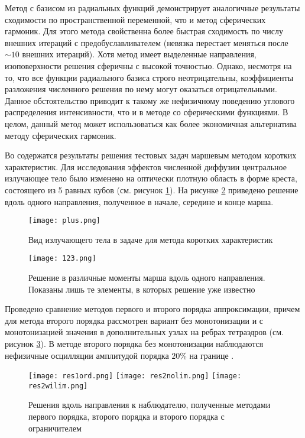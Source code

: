 Метод с базисом из радиальных функций демонстрирует аналогичные результаты сходимости по пространственной переменной, что и метод сферических гармоник. Для этого метода свойственна более быстрая сходимость по числу внешних итераций с предобуславливателем (невязка перестает меняться после $\sim 10$ внешних итераций). Хотя метод имеет выделенные направления, изоповерхности решения сферичны с высокой точностью. Однако, несмотря на то, что все функции радиального базиса строго неотрицательны, коэффициенты разложения численного решения по нему могут оказаться отрицательными. Данное обстоятельство приводит к такому же нефизичному поведению углового распределения интенсивности, что и в методе со сферическими функциями. В целом, данный метод может использоваться как более экономичная альтернатива методу сферических гармоник.

Во  содержатся результаты решения тестовых задач маршевым методом коротких характеристик. Для исследования эффектов численной диффузии центральное излучающее тело было изменено на оптически плотную область в форме креста, состоящего из 5 равных кубов (см. рисунок \ref{fig:plus}).
На рисунке \ref{fig:march} приведено решение вдоль одного направления, полученное в начале, середине и конце марша.
\begin{figure}[ht!]
\centering
\texttt{[image: plus.png]}
\caption{Вид излучающего тела в задаче для метода коротких характеристик}
\label{fig:plus}
\end{figure}
\begin{figure}[ht!]
\centering
\texttt{[image: 123.png]}
\caption{Решение в различные моменты марша вдоль одного направления. Показаны лишь те элементы, в которых решение уже известно}
\label{fig:march}
\end{figure}

Проведено сравнение методов первого и второго порядка аппроксимации, причем для метода второго порядка рассмотрен вариант без монотонизации и с монотонизацией значения в дополнительных узлах на ребрах тетраэдров (см. рисунок \ref{fig:ord}). В методе второго порядка без монотонизации наблюдаются нефизичные осцилляции амплитудой порядка $20\%$ на границе .
\begin{figure}[ht!]
\centering
\texttt{[image: res1ord.png]} %
\texttt{[image: res2nolim.png]} %
\texttt{[image: res2wilim.png]} %
\caption{Решения вдоль направления к наблюдателю, полученные методами первого порядка, второго порядка и второго порядка с ограничителем}
\label{fig:ord}
\end{figure}

